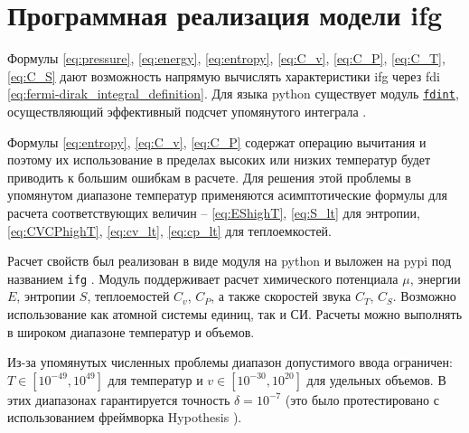 \section{Программная реализация модели \texorpdfstring{\acrshort{ifg}}{ИФГ}}
Формулы \eqref{eq:pressure}, \eqref{eq:energy}, \eqref{eq:entropy}, \eqref{eq:C_v}, \eqref{eq:C_P}, \eqref{eq:C_T}, \eqref{eq:C_S} дают возможность напрямую вычислять характеристики \acrshort{ifg} через \gls{fdi} \eqref{eq:fermi-dirak_integral_definition}.
Для языка \gls{python} существует модуль \href{https://pypi.org/project/fdint}{\texttt{fdint}}, осуществляющий эффективный подсчет упомянутого интеграла \cite{fdint}.

Формулы \eqref{eq:entropy}, \eqref{eq:C_v}, \eqref{eq:C_P} содержат операцию вычитания и поэтому их использование в пределах высоких или низких температур будет приводить к большим ошибкам в расчете.
Для решения этой проблемы в упомянутом диапазоне температур применяются асимптотические формулы для расчета соответствующих величин -- \eqref{eq:EShighT}, \eqref{eq:S_lt} для энтропии, \eqref{eq:CVCPhighT}, \eqref{eq:cv_lt}, \eqref{eq:cp_lt} для теплоемкостей.

Расчет свойств был реализован в виде модуля на \gls{python} и выложен на \gls{pypi} под названием \texttt{ifg} \cite{ifgpy}.
Модуль поддерживает расчет химического потенциала $\mu$, энергии $E$, энтропии $S$, теплоемостей $C_v$, $C_P$, а также скоростей звука $C_T$, $C_S$.
Возможно использование как атомной системы единиц, так и СИ.
Расчеты можно выполнять в широком диапазоне температур и объемов.

Из-за упомянутых численных проблемы диапазон допустимого ввода ограничен: $T \in [10^{-49}, 10^{49}]$ для температур и $v \in [10^{-30}, 10^{20}]$ для удельных объемов.
В этих диапазонах гарантируется точность $\delta = 10^{-7}$ (это было протестировано с использованием фреймворка Hypothesis \cite{MacIver2019Hypothesis}).



